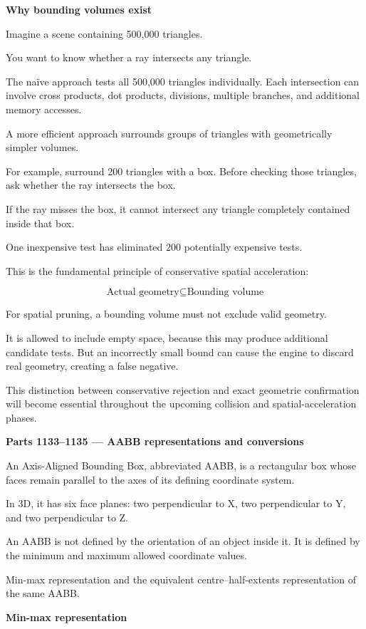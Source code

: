 \textbf{Why bounding volumes exist}

Imagine a scene containing 500,000 triangles.

You want to know whether a ray intersects any triangle.

The naïve approach tests all 500,000 triangles individually. Each intersection can involve cross products, dot products, divisions, multiple branches, and additional memory accesses.

A more efficient approach surrounds groups of triangles with geometrically simpler volumes.

For example, surround 200 triangles with a box. Before checking those triangles, ask whether the ray intersects the box.

If the ray misses the box, it cannot intersect any triangle completely contained inside that box.

One inexpensive test has eliminated 200 potentially expensive tests.

This is the fundamental principle of conservative spatial acceleration:

\[
\boxed{\text{Actual geometry}\subseteq\text{Bounding volume}}
\]

For spatial pruning, a bounding volume must not exclude valid geometry.

It is allowed to include empty space, because this may produce additional candidate tests. But an incorrectly small bound can cause the engine to discard real geometry, creating a false negative.

This distinction between conservative rejection and exact geometric confirmation will become essential throughout the upcoming collision and spatial-acceleration phases.

\textbf{Parts 1133--1135 --- AABB representations and conversions}

An Axis-Aligned Bounding Box, abbreviated AABB, is a rectangular box whose faces remain parallel to the axes of its defining coordinate system.

In 3D, it has six face planes: two perpendicular to X, two perpendicular to Y, and two perpendicular to Z.

An AABB is not defined by the orientation of an object inside it. It is defined by the minimum and maximum allowed coordinate values.

Min-max representation and the equivalent centre--half-extents representation of the same AABB.

\textbf{Min-max representation}

